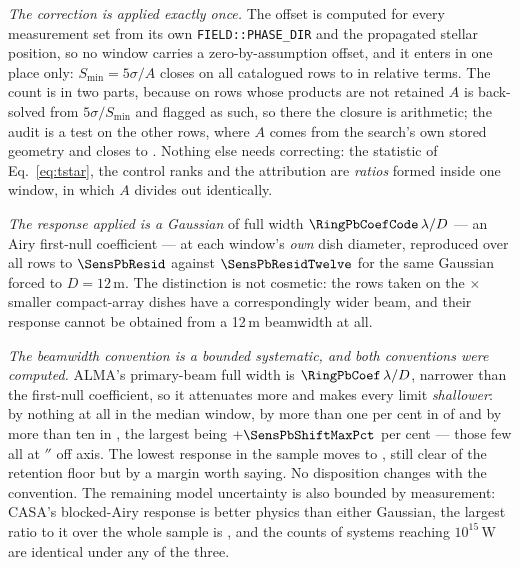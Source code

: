 \emph{The correction is applied exactly once.} The offset is computed for
every measurement set from its own \texttt{FIELD::PHASE\_DIR} and the
propagated stellar position, so no window carries a zero-by-assumption
offset, and it enters in one place only: $S_{\min}=5\sigma/A$ closes on all
\PbSminClosed{} catalogued rows to \PbSminWorstRes{} in relative terms. The
count is in two parts, because on \PbSminTaut{} rows whose products are not
retained $A$ is back-solved from $5\sigma/S_{\min}$ and flagged as such, so
there the closure is arithmetic; the audit is a test on the other
\PbSminIndep{} rows, where $A$ comes from the search's own stored geometry and
closes to \PbSminIndepRes. Nothing else needs correcting: the statistic of
Eq.~\ref{eq:tstar}, the control ranks and the attribution are \emph{ratios}
formed inside one window, in which $A$ divides out identically.

\emph{The response applied is a Gaussian} of full width
$\RingPbCoefCode\,\lambda/D$ --- an Airy first-null coefficient --- at each
window's \emph{own} dish diameter, reproduced over all \NWindows{}
rows to $\SensPbResid$ against $\SensPbResidTwelve$ for the same Gaussian
forced to $D=12$\,m. The distinction is not cosmetic: the \PbNAcaRow{} rows
taken on the \PbAcaRatio$\times$ smaller compact-array dishes have a
correspondingly wider beam, and their response cannot be obtained from a
12\,m beamwidth at all.

\emph{The beamwidth convention is a bounded systematic, and both
conventions were computed.} ALMA's
primary-beam full width is $\RingPbCoef\,\lambda/D$, narrower than the
first-null coefficient, so it attenuates more and makes every limit
\emph{shallower}: by nothing at all in the median window, by more than one
per cent in \SensPbNOnePct{} of \NWindows{} and by more than ten in
\SensPbNTenPct, the largest being $+\SensPbShiftMaxPct$ per cent --- those
few all \SensPbWorstStar{} at \SensPbWorstOff$''$ off axis. The lowest
response in the sample moves \SensPbAMin{} to \SensPbAMinAlma, still clear
of the \SensPbFloor{} retention floor but by a margin worth saying.
No disposition changes with the convention. The
remaining model uncertainty is also bounded by measurement: CASA's
blocked-Airy response is better physics than either Gaussian, the largest
ratio to it over the whole sample is \PbModelMax, and the counts of systems
reaching $10^{15}$\,W are identical under any of the three.

